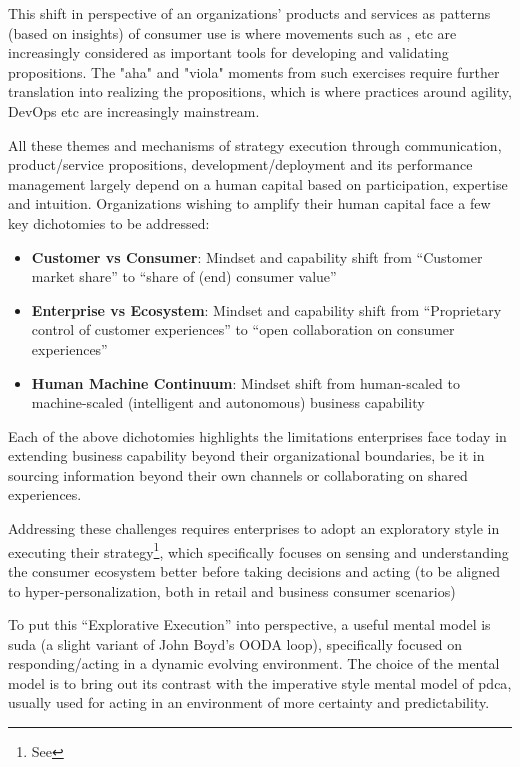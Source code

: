 This shift in perspective of an organizations’ products and services as patterns (based on insights) of consumer use
is where movements such as ,  etc are increasingly considered
as important tools for developing and validating propositions.
The "aha" and "viola" moments from such exercises require further translation into realizing the propositions,
which is where practices around agility, DevOps etc are increasingly mainstream.

All these themes and mechanisms of strategy execution through communication, product/service propositions,
development/deployment and its performance management
largely depend on a human capital based on participation, expertise and intuition.
Organizations wishing to amplify their human capital face a few key dichotomies to be addressed:

\begin{itemize}
    \item \textbf{Customer vs Consumer}: Mindset and capability shift from ``Customer market share'' to
          ``share of (end) consumer value''
    \item \textbf{Enterprise vs Ecosystem}: Mindset and capability shift from
          “Proprietary control of customer experiences” to “open collaboration on consumer experiences”
    \item \textbf{Human Machine Continuum}: Mindset shift from human-scaled to machine-scaled
          (intelligent and autonomous) business capability
\end{itemize}
Each of the above dichotomies highlights the limitations enterprises face today in extending business capability
beyond their organizational boundaries, be it in sourcing information beyond their own channels or collaborating
on shared experiences.

Addressing these challenges requires enterprises to adopt an exploratory style in executing their
strategy\footnote{See },
which specifically focuses on sensing and understanding the consumer ecosystem better before taking decisions
and acting (to be aligned to hyper-personalization, both in retail and business consumer scenarios)

To put this “Explorative Execution” into perspective, a useful mental model is \gls{suda}
(a slight variant of John Boyd’s OODA loop),
specifically focused on responding/acting in a dynamic evolving environment.
The choice of the mental model is to bring out its contrast with the imperative style mental model of \gls{pdca},
usually used for acting in an environment of more certainty and predictability.

